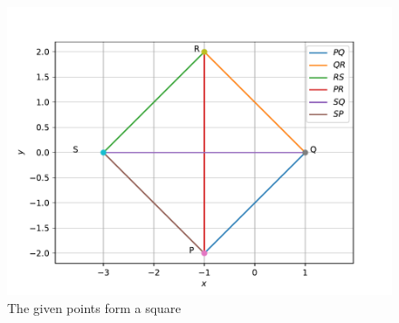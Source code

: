\begin{enumerate}[label=\thesection.\arabic*.,ref=\thesection.\theenumi]
\begin{figure}[!ht]
	\includegraphics[width=\columnwidth]{figs/quad1.pdf}
	\caption{The given points form a square}
	\label{fig:3.5.4_quadrilateral1}
\end{figure}


\end{enumerate}

%



